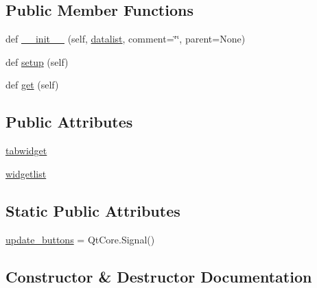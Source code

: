 \subsection*{Public Member Functions}
\begin{DoxyCompactItemize}
\item 
def \hyperlink{classmatplotlib_1_1backends_1_1qt__editor_1_1__formlayout_1_1FormTabWidget_ac47b32ec09d91b3a99c0478da86fffed}{\+\_\+\+\_\+init\+\_\+\+\_\+} (self, \hyperlink{namespacematplotlib_1_1backends_1_1qt__editor_1_1__formlayout_aa6cc072f6786851cbe265173ecb84a93}{datalist}, comment=\char`\"{}\char`\"{}, parent=None)
\item 
def \hyperlink{classmatplotlib_1_1backends_1_1qt__editor_1_1__formlayout_1_1FormTabWidget_a46c704af50156b7fe4717a13d27949f6}{setup} (self)
\item 
def \hyperlink{classmatplotlib_1_1backends_1_1qt__editor_1_1__formlayout_1_1FormTabWidget_ad1e6d48d2400ca7bd2f3885058a57f6a}{get} (self)
\end{DoxyCompactItemize}
\subsection*{Public Attributes}
\begin{DoxyCompactItemize}
\item 
\hyperlink{classmatplotlib_1_1backends_1_1qt__editor_1_1__formlayout_1_1FormTabWidget_af7dc83a26538c4fd566361e1bfedb041}{tabwidget}
\item 
\hyperlink{classmatplotlib_1_1backends_1_1qt__editor_1_1__formlayout_1_1FormTabWidget_a556e2c3ebc122df0b37e6da6013ac6b7}{widgetlist}
\end{DoxyCompactItemize}
\subsection*{Static Public Attributes}
\begin{DoxyCompactItemize}
\item 
\hyperlink{classmatplotlib_1_1backends_1_1qt__editor_1_1__formlayout_1_1FormTabWidget_ae267c101403fa1d1a2207fc0e7541ed8}{update\+\_\+buttons} = Qt\+Core.\+Signal()
\end{DoxyCompactItemize}


\subsection{Constructor \& Destructor Documentation}
\mbox{\label{classmatplotlib_1_1backends_1_1qt__editor_1_1__formlayout_1_1FormTabWidget_ac47b32ec09d91b3a99c0478da86fffed}} 

